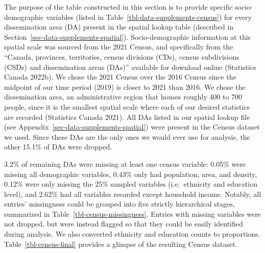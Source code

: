 \documentclass[
  letterpaper,
  DIV=11,
  numbers=noendperiod]{scrartcl}
\begin{document}
The purpose of the table constructed in this section is to provide
specific socio-demographic variables (listed in
Table~\ref{tbl-data-supplements-census}) for every dissemination area
(DA) present in the spatial lookup table (described in
Section~\ref{sec-data-supplements-spatial}). Socio-demographic
information at this spatial scale was sourced from the 2021 Census, and
specifically from the ``Canada, provinces, territories, census divisions
(CDs), census subdivisions (CSDs) and dissemination areas (DAs)''
available for download online (Statistics Canada 2022b). We chose the
2021 Census over the 2016 Census since the midpoint of our time period
(2019) is closer to 2021 than 2016. We chose the dissemination area, an
administrative region that houses roughly 400 to 700 people, since it is
the smallest spatial scale where each of our desired statistics are
recorded (Statistics Canada 2021). All DAs listed in our spatial lookup
file (see Appendix~\ref{sec-data-supplements-spatial}) were present in
the Census dataset we used. Since these DAs are the only ones we would
ever use for analysis, the other 15.1\% of DAs were dropped.

3.2\% of remaining DAs were missing at least one census variable: 0.05\%
were missing all demographic variables, 0.43\% only had population,
area, and density, 0.12\% were only missing the 25\% sampled variables
(i.e.~ethnicity and education level), and 2.62\% had all variables
recorded except household income. Notably, all entries' missingness
could be grouped into five strictly hierarchical stages, summarized in
Table~\ref{tbl-census-missingness}. Entries with missing variables were
not dropped, but were instead flagged so that they could be easily
identified during analysis. We also converted ethnicity and education
counts to proportions. Table~\ref{tbl-census-final} provides a glimpse
of the resulting Census dataset.
\end{document}

